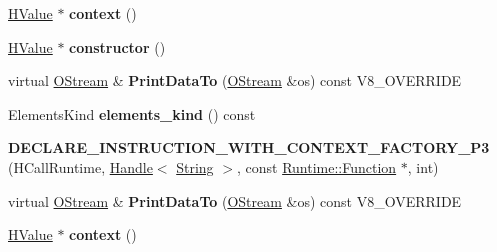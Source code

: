 \begin{DoxyCompactItemize}
\item 
\hypertarget{classv8_1_1internal_1_1_v8___f_i_n_a_l_a911a04b75b22f133c5eb5eafcc2d5f87}{}\hyperlink{classv8_1_1internal_1_1_h_value}{H\+Value} $\ast$ {\bfseries context} ()\label{classv8_1_1internal_1_1_v8___f_i_n_a_l_a911a04b75b22f133c5eb5eafcc2d5f87}

\item 
\hypertarget{classv8_1_1internal_1_1_v8___f_i_n_a_l_aa595655bfd3e3ccabfe5ccc512c9d131}{}\hyperlink{classv8_1_1internal_1_1_h_value}{H\+Value} $\ast$ {\bfseries constructor} ()\label{classv8_1_1internal_1_1_v8___f_i_n_a_l_aa595655bfd3e3ccabfe5ccc512c9d131}

\item 
\hypertarget{classv8_1_1internal_1_1_v8___f_i_n_a_l_ac450dad970b14246be761ccf5004924b}{}virtual \hyperlink{classv8_1_1internal_1_1_o_stream}{O\+Stream} \& {\bfseries Print\+Data\+To} (\hyperlink{classv8_1_1internal_1_1_o_stream}{O\+Stream} \&os) const V8\+\_\+\+O\+V\+E\+R\+R\+I\+D\+E\label{classv8_1_1internal_1_1_v8___f_i_n_a_l_ac450dad970b14246be761ccf5004924b}

\item 
\hypertarget{classv8_1_1internal_1_1_v8___f_i_n_a_l_add83d3b1af43467fa5b1280206676eb7}{}Elements\+Kind {\bfseries elements\+\_\+kind} () const \label{classv8_1_1internal_1_1_v8___f_i_n_a_l_add83d3b1af43467fa5b1280206676eb7}

\item 
\hypertarget{classv8_1_1internal_1_1_v8___f_i_n_a_l_a0922e73d0bc1412f50d4c9c50a1a7601}{}{\bfseries D\+E\+C\+L\+A\+R\+E\+\_\+\+I\+N\+S\+T\+R\+U\+C\+T\+I\+O\+N\+\_\+\+W\+I\+T\+H\+\_\+\+C\+O\+N\+T\+E\+X\+T\+\_\+\+F\+A\+C\+T\+O\+R\+Y\+\_\+\+P3} (H\+Call\+Runtime, \hyperlink{classv8_1_1internal_1_1_handle}{Handle}$<$ \hyperlink{classv8_1_1internal_1_1_string}{String} $>$, const \hyperlink{structv8_1_1internal_1_1_runtime_1_1_function}{Runtime\+::\+Function} $\ast$, int)\label{classv8_1_1internal_1_1_v8___f_i_n_a_l_a0922e73d0bc1412f50d4c9c50a1a7601}

\item 
\hypertarget{classv8_1_1internal_1_1_v8___f_i_n_a_l_ac450dad970b14246be761ccf5004924b}{}virtual \hyperlink{classv8_1_1internal_1_1_o_stream}{O\+Stream} \& {\bfseries Print\+Data\+To} (\hyperlink{classv8_1_1internal_1_1_o_stream}{O\+Stream} \&os) const V8\+\_\+\+O\+V\+E\+R\+R\+I\+D\+E\label{classv8_1_1internal_1_1_v8___f_i_n_a_l_ac450dad970b14246be761ccf5004924b}

\item 
\hypertarget{classv8_1_1internal_1_1_v8___f_i_n_a_l_a911a04b75b22f133c5eb5eafcc2d5f87}{}\hyperlink{classv8_1_1internal_1_1_h_value}{H\+Value} $\ast$ {\bfseries context} ()\label{classv8_1_1internal_1_1_v8___f_i_n_a_l_a911a04b75b22f133c5eb5eafcc2d5f87}


\end{DoxyCompactItemize}
